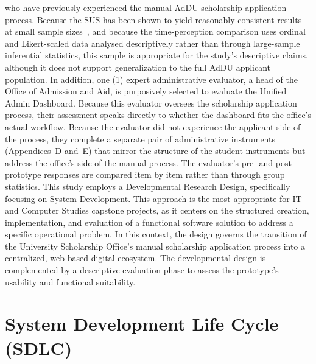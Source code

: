 who have previously experienced the manual AdDU scholarship application
process. Because the SUS has been shown to yield reasonably consistent
results at small sample sizes~\cite{ref42}, and because the
time-perception comparison uses ordinal and Likert-scaled data analysed
descriptively rather than through large-sample inferential statistics,
this sample is appropriate for the study's descriptive claims, although
it does not support generalization to the full AdDU applicant
population. In addition, one (1) expert administrative evaluator, a head
of the Office of Admission and Aid, is purposively selected to evaluate
the Unified Admin Dashboard. Because this evaluator oversees the
scholarship application process, their assessment speaks directly to
whether the dashboard fits the office's actual workflow. Because the
evaluator did not experience the applicant side of the process, they
complete a separate pair of administrative instruments (Appendices~D
and~E) that mirror the structure of the student instruments but address
the office's side of the manual process. The evaluator's pre- and
post-prototype responses are compared item by item rather than through
group statistics. This study employs a Developmental Research Design, specifically focusing on System Development. This approach is the most appropriate for IT and Computer Studies capstone projects, as it centers on the structured creation, implementation, and evaluation of a functional software solution to address a specific operational problem. In this context, the design governs the transition of the University Scholarship Office's manual scholarship application process into a centralized, web-based digital ecosystem. The developmental design is complemented by a descriptive evaluation phase to assess the prototype's usability and functional suitability.

\section{System Development Life Cycle (SDLC)}
\label{sec:sdlc}


